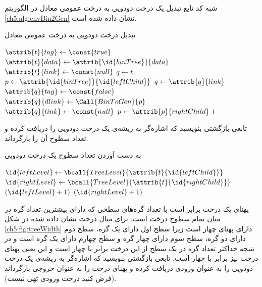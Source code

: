 شبه کد تابع تبدیل یک درخت دودویی به درخت عمومی معادل‌ در الگوریتم {\eqref{ch5:alg:cnvBin2Gen}} نشان داده شده است. 
\begin{algorithm}
\caption{تبدیل درخت دودویی به درخت عمومی معادل}\label{ch5:alg:cnvBin2Gen}
\begin{latin}
\begin{algorithmic}[1]
				\State	\Return {}
		\EndIf
		\State	{}
		\State	$\attrib{t}{tag} \gets \const{true}$
		\State	$\attrib{t}{data} \gets \attrib{\id{binTree}}{data}$
		\State	$\attrib{t}{link} \gets \const{null}$
		\State	$q \gets t$
		\State	$p \gets \attrib{\id{binTree}}{\id{leftChild}}$
				\State	{}
				\State	$q \gets \attrib{q}{link}$
				\State	$\attrib{q}{tag} \gets \const{false}$
				\State	$\attrib{q}{dlink} \gets \Call{BinToGen}{p}$
				\State	$\attrib{q}{link} \gets \const{null}$
				\State	$p \gets \attrib{p}{rightChild}$
		\EndWhile
		\State	\Return $t$
\EndFunction
\end{algorithmic}
\end{latin}
\end{algorithm}

 تابعی بازگشتی بنویسید که اشاره‌گر به ریشه‌ی یک درخت دودویی را دریافت کرده و تعداد سطوح آن را بازگرداند.


\begin{algorithm}
\caption{به دست آوردن تعداد سطوح یک درخت دودویی}\label{ch5:alg:treeLevel}
\begin{latin}
\begin{algorithmic}[1]
			\State	{}
		\EndIf
		\State	$\id{leftLevel} \gets \bcall{TreeLevel}{\attrib{t}{\id{leftChild}}}$
		\State	$\id{rightLevel} \gets \bcall{TreeLevel}{\attrib{t}{\id{rightChild}}}$			
			\State	\Return	$(\id{leftLevel} + 1)$
		\Else
			\State	\Return $(\id{rightLevel} + 1)$
		\EndIf
\EndFunction
\end{algorithmic}
\end{latin}
\end{algorithm}

 پهنای یک درخت برابر است با تعداد گره‌های سطحی که دارای بیشترین تعداد گره در میان تمام سطوح درخت است.  برای مثال درخت نشان داده شده در شکل {\eqref{ch5:fig:treeWidth}} دارای پهنای چهار است زیرا سطح اول دارای یک گره، سطح دوم دارای دو گره، سطح سوم دارای چهار گره و سطح چهارم دارای یک گره است و در نتیجه حداکثر تعداد گره در یک سطح از این درخت برابر با چهار است و این یعنی پهنای درخت نیز برابر با چهار است. تابعی بازگشتی بنویسید که اشاره‌گر به ریشه‌ی یک درخت دودویی را به عنوان ورودی دریافت کرده و پهنای درخت را به عنوان خروجی بازگرداند (فرض کنید درخت ورودی تهی نیست).

